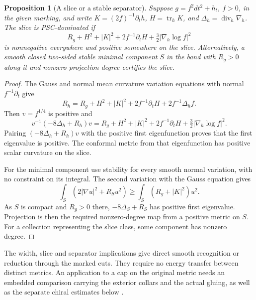 \documentclass[11pt,letterpaper]{article}
\numberwithin{equation}{section}
\newtheorem{proposition}[theorem]{Proposition}
\theoremstyle{remark}
\DeclareMathOperator{\tr}{tr}
\DeclareMathOperator{\divg}{div}
\begin{document}
\begin{proposition}[A slice or a stable separator]\label{prop:slice}
Suppose \(g=f^2dt^2+h_t\), \(f>0\), in the given marking,
and write \(K=(2f)^{-1}\partial_t h\), \(H=\tr_h K\), and
\(\Delta_h=\divg_h\nabla_h\). The slice is PSC-dominated
if
\[
 R_g+H^2+|K|^2+2f^{-1}\partial_t H
       +\tfrac32|\nabla_h\log f|^2
\]
is nonnegative everywhere and positive somewhere on the
slice. Alternatively, a smooth closed two-sided stable
minimal component \(S\) in the band with \(R_g>0\) along
it and nonzero projection degree certifies the slice.
\end{proposition}
\begin{proof}
The Gauss and normal mean curvature variation equations
with normal \(f^{-1}\partial_t\) give
\[
 R_h=R_g+H^2+|K|^2+2f^{-1}\partial_tH
                +2f^{-1}\Delta_h f.
\]
Then \(v=f^{1/4}\) is positive and
\[
 v^{-1}(-8\Delta_h+R_h)v
 =R_g+H^2+|K|^2+2f^{-1}\partial_tH
                  +\tfrac32|\nabla_h\log f|^2 .
\]
Pairing \((-8\Delta_h+R_h)v\) with the positive first
eigenfunction proves that the first eigenvalue is positive.
The conformal metric from that eigenfunction has positive
scalar curvature on the slice.

For the minimal component use stability for every smooth
normal variation, with no constraint on its integral.
The second variation with the Gauss equation gives
\[
 \int_S(2|\nabla u|^2+R_Su^2)\ge
 \int_S(R_g+|K|^2)u^2 .
\]
As \(S\) is compact and \(R_g>0\) there,
\(-8\Delta_S+R_S\) has positive first eigenvalue.
Projection is then the required nonzero-degree map from
a positive metric on \(S\). For a collection representing
the slice class, some component has nonzero degree.
\end{proof}

The width, slice and separator implications give direct
smooth recognition or reduction through the marked cuts.
They require no energy transfer between distinct metrics.
An application to a cap on the original metric needs an
embedded comparison carrying the exterior collars and the
actual gluing, as well as the separate chiral estimates
below \cite{Baker2026CollarDeformation,Baker2026CollarProgram}.
\end{document}
